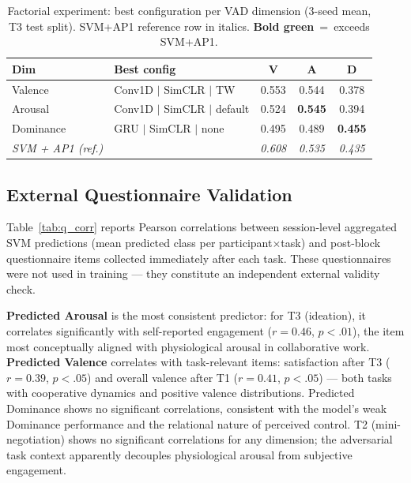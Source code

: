 \documentclass[sigconf,nonacm]{acmart}
\newcommand{\best}[1]{\textbf{\textcolor{bestcol}{#1}}}
\begin{document}
\begin{table}[t]
\caption{Factorial experiment: best configuration per VAD dimension
(3-seed mean, T3 test split). SVM+AP1 reference row in italics.
\best{Bold green}~=~exceeds SVM+AP1.}
\label{tab:factorial_best}
\centering
\setlength{\tabcolsep}{4pt}
\small
\begin{tabular}{llccc}
\toprule
\textbf{Dim} & \textbf{Best config} & \textbf{V} & \textbf{A} & \textbf{D} \\
\midrule
Valence   & Conv1D $|$ SimCLR $|$ TW      & 0.553 & 0.544 & 0.378 \\
Arousal   & Conv1D $|$ SimCLR $|$ default & 0.524 & \best{0.545} & 0.394 \\
Dominance & GRU $|$ SimCLR $|$ none       & 0.495 & 0.489 & \best{0.455} \\
\midrule
\textit{SVM + AP1 (ref.)}
  & & \textit{0.608} & \textit{0.535} & \textit{0.435} \\
\bottomrule
\end{tabular}
\end{table}

\subsection{External Questionnaire Validation}
\label{sec:q_validation}

Table~\ref{tab:q_corr} reports Pearson correlations between session-level
aggregated SVM predictions (mean predicted class per participant$\times$task)
and post-block questionnaire items collected immediately after each task.
These questionnaires were not used in training --- they constitute an
independent external validity check.

\textbf{Predicted Arousal} is the most consistent predictor:
for T3 (ideation), it correlates significantly with self-reported engagement
($r{=}0.46$, $p{<}.01$), the item most conceptually aligned with physiological
arousal in collaborative work.
\textbf{Predicted Valence} correlates with task-relevant items: satisfaction
after T3 ($r{=}0.39$, $p{<}.05$) and overall valence after T1
($r{=}0.41$, $p{<}.05$) --- both tasks with cooperative dynamics and
positive valence distributions.
Predicted Dominance shows no significant correlations, consistent with the
model's weak Dominance performance and the relational nature of perceived control.
T2 (mini-negotiation) shows no significant correlations for any dimension;
the adversarial task context apparently decouples physiological arousal from
subjective engagement.
\end{document}
